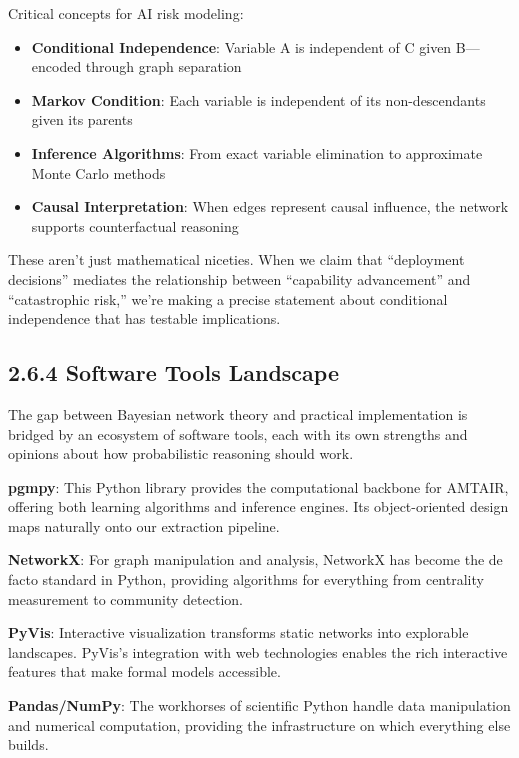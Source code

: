 \documentclass[
  11pt,
  letterpaper,
]{book}
\providecommand{\tightlist}{%
  \setlength{\itemsep}{0pt}\setlength{\parskip}{0pt}}
\begin{document}
Critical concepts for AI risk modeling:

\begin{itemize}
\tightlist
\item
  \textbf{Conditional Independence}: Variable A is independent of C
  given B---encoded through graph separation
\item
  \textbf{Markov Condition}: Each variable is independent of its
  non-descendants given its parents
\item
  \textbf{Inference Algorithms}: From exact variable elimination to
  approximate Monte Carlo methods
\item
  \textbf{Causal Interpretation}: When edges represent causal influence,
  the network supports counterfactual reasoning
\end{itemize}

These aren't just mathematical niceties. When we claim that ``deployment
decisions'' mediates the relationship between ``capability advancement''
and ``catastrophic risk,'' we're making a precise statement about
conditional independence that has testable implications.

\subsection{2.6.4 Software Tools Landscape}\label{sec-software-tools}

The gap between Bayesian network theory and practical implementation is
bridged by an ecosystem of software tools, each with its own strengths
and opinions about how probabilistic reasoning should work.

\textbf{pgmpy}: This Python library provides the computational backbone
for AMTAIR, offering both learning algorithms and inference engines. Its
object-oriented design maps naturally onto our extraction pipeline.

\textbf{NetworkX}: For graph manipulation and analysis, NetworkX has
become the de facto standard in Python, providing algorithms for
everything from centrality measurement to community detection.

\textbf{PyVis}: Interactive visualization transforms static networks
into explorable landscapes. PyVis's integration with web technologies
enables the rich interactive features that make formal models
accessible.

\textbf{Pandas/NumPy}: The workhorses of scientific Python handle data
manipulation and numerical computation, providing the infrastructure on
which everything else builds.
\end{document}
